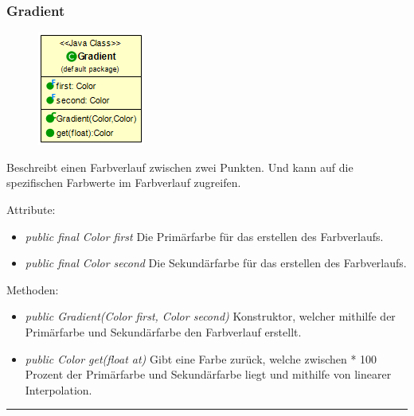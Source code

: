 \subsubsection{Gradient} 
\begin{minipage}{0.3\textwidth}
    \begin{figure}[H]
    {\centering\includegraphics[scale = 0.6
    ]{media/view/theme/Gradient_Class.png}}
    \end{figure}
    \end{minipage} \hfill
    \begin{minipage}{0.6\textwidth}
    Beschreibt einen Farbverlauf zwischen zwei Punkten. Und kann auf die spezifischen Farbwerte im Farbverlauf zugreifen.
    \end{minipage}
Attribute: \begin{itemize} [noitemsep]
     \item \emph{public final Color first} Die Primärfarbe für das erstellen des Farbverlaufs.
    \item \emph{public final Color second} Die Sekundärfarbe für das erstellen des Farbverlaufs.
\end{itemize}
Methoden: \begin{itemize} [noitemsep]
    \item \emph{public Gradient(Color first, Color second)} Konstruktor, welcher mithilfe der Primärfarbe und Sekundärfarbe den Farbverlauf erstellt.
    \item \emph{public Color get(float at)} Gibt eine Farbe zurück, welche zwischen * 100 Prozent der Primärfarbe und Sekundärfarbe liegt und mithilfe von linearer Interpolation.
\end{itemize}

\rule{\textwidth}{0.4pt}